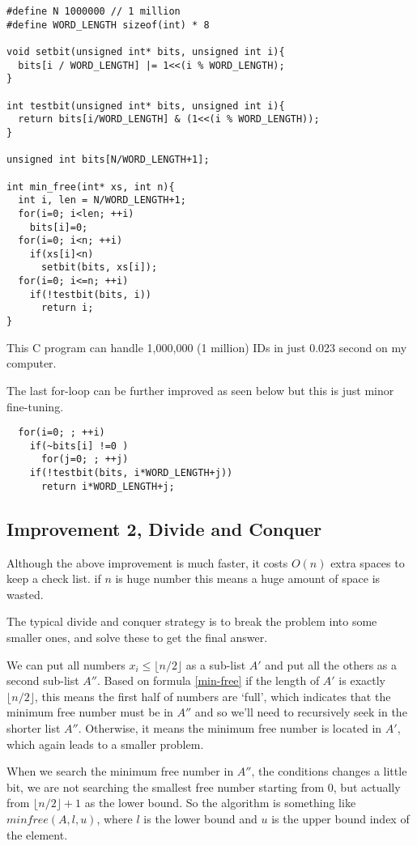 \documentclass[UTF8]{article}
\begin{document}
\lstset{language = C}
\begin{lstlisting}
#define N 1000000 // 1 million
#define WORD_LENGTH sizeof(int) * 8

void setbit(unsigned int* bits, unsigned int i){
  bits[i / WORD_LENGTH] |= 1<<(i % WORD_LENGTH);
}

int testbit(unsigned int* bits, unsigned int i){
  return bits[i/WORD_LENGTH] & (1<<(i % WORD_LENGTH));
}

unsigned int bits[N/WORD_LENGTH+1];

int min_free(int* xs, int n){
  int i, len = N/WORD_LENGTH+1;
  for(i=0; i<len; ++i)
    bits[i]=0;
  for(i=0; i<n; ++i)
    if(xs[i]<n)
      setbit(bits, xs[i]);
  for(i=0; i<=n; ++i)
    if(!testbit(bits, i))
      return i;
}
\end{lstlisting}

This C program can handle 1,000,000 (1 million) IDs in just 0.023 second
on my computer.

The last for-loop can be further improved as seen below but this is just minor
fine-tuning.

\begin{lstlisting}
  for(i=0; ; ++i)
    if(~bits[i] !=0 )
      for(j=0; ; ++j)
	if(!testbit(bits, i*WORD_LENGTH+j))
	  return i*WORD_LENGTH+j;
\end{lstlisting}

\subsection{Improvement 2, Divide and Conquer}
Although the above improvement is much faster, it costs $O(n)$ extra
spaces to keep a check list. if $n$ is huge number this means
a huge amount of space is wasted.

The typical divide and conquer strategy is to break the problem
into some smaller ones, and solve these to get the final answer.

We can put all numbers $x_i \leq \lfloor n/2 \rfloor$ as a sub-list $A'$ and put all the others as
a second sub-list $A''$. Based on formula \ref{min-free} if the length of $A'$ is exactly $\lfloor n/2 \rfloor$, this means
the first half of numbers are `full', which indicates that the
minimum free number must be in $A''$ and so we'll need to recursively seek
in the shorter list $A''$. Otherwise, it means the minimum free
number is located in $A'$, which again leads to a smaller problem.

When we search the minimum free number in $A''$, the conditions changes
a little bit, we are not searching the smallest free number starting from
$0$, but actually from $\lfloor n/2 \rfloor + 1$ as the lower bound.
So the algorithm is something like $minfree(A, l, u)$, where $l$ is
the lower bound and $u$ is the upper bound index of the element.
\end{document}
